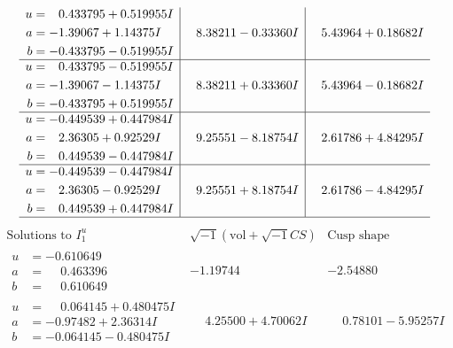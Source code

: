 \documentclass[1p]{elsarticle_modified}
\theoremstyle{definition}
\newcommand{\I}{\sqrt{-1}}
\begin{document}
$$\begin{array}{c|c|c}
\begin{aligned}
u &= \phantom{-}0.433795 + 0.519955 I \\
a &= -1.39067 + 1.14375 I \\
b &= -0.433795 - 0.519955 I\end{aligned}
 & \phantom{-}8.38211 - 0.33360 I & \phantom{-}5.43964 + 0.18682 I \\ \hline\begin{aligned}
u &= \phantom{-}0.433795 - 0.519955 I \\
a &= -1.39067 - 1.14375 I \\
b &= -0.433795 + 0.519955 I\end{aligned}
 & \phantom{-}8.38211 + 0.33360 I & \phantom{-}5.43964 - 0.18682 I \\ \hline\begin{aligned}
u &= -0.449539 + 0.447984 I \\
a &= \phantom{-}2.36305 + 0.92529 I \\
b &= \phantom{-}0.449539 - 0.447984 I\end{aligned}
 & \phantom{-}9.25551 - 8.18754 I & \phantom{-}2.61786 + 4.84295 I \\ \hline\begin{aligned}
u &= -0.449539 - 0.447984 I \\
a &= \phantom{-}2.36305 - 0.92529 I \\
b &= \phantom{-}0.449539 + 0.447984 I\end{aligned}
 & \phantom{-}9.25551 + 8.18754 I & \phantom{-}2.61786 - 4.84295 I\\
 \hline 
 \end{array}$$\newpage$$\begin{array}{c|c|c}  
\text{Solutions to }I^u_{1}& \I (\text{vol} + \sqrt{-1}CS) & \text{Cusp shape}\\
 \hline 
\begin{aligned}
u &= -0.610649\phantom{ +0.000000I} \\
a &= \phantom{-}0.463396\phantom{ +0.000000I} \\
b &= \phantom{-}0.610649\phantom{ +0.000000I}\end{aligned}
 & -1.19744\phantom{ +0.000000I} & -2.54880\phantom{ +0.000000I} \\ \hline\begin{aligned}
u &= \phantom{-}0.064145 + 0.480475 I \\
a &= -0.97482 + 2.36314 I \\
b &= -0.064145 - 0.480475 I\end{aligned}
 & \phantom{-}4.25500 + 4.70062 I & \phantom{-}0.78101 - 5.95257 I \\ \hline\begin{aligned}

\end{aligned}
\end{array}$$
\end{document}
